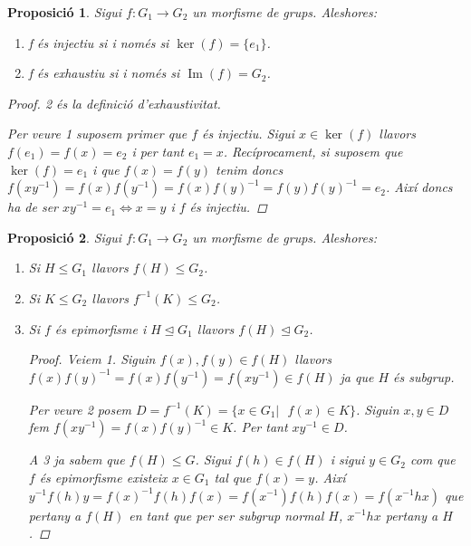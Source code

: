 \documentclass[a4paper,11pt]{report}
\newcommand{\inv}[1]{#1^{-1}}
\theoremstyle{theorem}
\newtheorem{proposicio}{\normalfont \sffamily\bfseries Proposició}[section]
\theoremstyle{definition}
\DeclareMathOperator{\ima}{Im}
\begin{document}
\begin{proposicio}
	Sigui $f:G_1\longrightarrow G_2$ un morfisme de grups. Aleshores:
	\begin{enumerate}
		\item f és injectiu si i només si $\ker(f)=\{e_1\}$.
		\item f és exhaustiu si i només si $\ima(f)=G_2$.
	\end{enumerate}
\begin{proof}
	2 és la definició d'exhaustivitat.
	
	Per veure 1 suposem primer que $f$ és injectiu. Sigui $x\in\ker(f)$ llavors $f(e_1)=f(x)=e_2$ i per tant $e_1=x$. Recíprocament, si suposem que $\ker(f)={e_1}$ i que $f(x)=f(y)$ tenim doncs $f(x\inv{y})=f(x)f(\inv{y})=f(x)\inv{f(y)}=f(y)\inv{f(y)}=e_2$. Així doncs ha de ser $x\inv{y}=e_1\Leftrightarrow x=y$ i $f$ és injectiu.
\end{proof}
\end{proposicio}
\begin{proposicio}
	Sigui $f:G_1\longrightarrow G_2$ un morfisme de grups. Aleshores:
	\begin{enumerate}
		\item Si $H\leq G_1$ llavors $f(H)\leq G_2$.
		\item Si $K\leq G_2$ llavors $\inv{f}(K)\leq G_2$.
		\item Si $f$ és epimorfisme i $H\unlhd G_1$ llavors $f(H)\unlhd G_2$.
		\begin{proof}
		Veiem 1. Siguin $f(x),f(y)\in f(H)$ llavors $f(x)\inv{f(y)}=f(x)f(\inv{y})=f(x\inv{y})\in f(H)$ ja que $H$ és subgrup.
		
		Per veure 2 posem $D=\inv{f}(K)=\{x\in G_1|\text{ }f(x)\in K\}$. Siguin $x,y\in D$ fem $f(x\inv{y})=f(x)\inv{f(y)}\in K$. Per tant $x\inv{y}\in D$.
		
		A 3 ja sabem que $f(H)\leq G$. Sigui $f(h)\in f(H)$ i sigui $y\in G_2$ com que $f$ és epimorfisme existeix $x\in G_1$ tal que $f(x)=y$. Així $\inv{y}f(h)y=\inv{f(x)}f(h)f(x)=f(\inv{x})f(h)f(x)=f(\inv{x}hx)$ que pertany a $f(H)$ en tant que per ser subgrup normal $H$, $\inv{x}hx$ pertany a $H$.		\end{proof} 
	\end{enumerate}
\end{proposicio}
\end{document}
